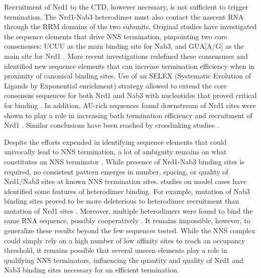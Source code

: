 Recruitment of Nrd1 to the CTD, however necessary, is not sufficient to trigger termination. 
The Nrd1-Nab3 heterodimer must also contact the nascent RNA through the RRM domains of the two subunits.
Original studies have investigated the sequence elements that drive NNS termination, pinpointing two core consensuses: UCUU as the main binding site for Nab3, and GUA[A/G] as the main site for Nrd1 \cite{carroll:2004:identification}. 
More recent investigations redefined these consensuses and identified new sequence elements that can increase termination efficiency when in proximity of canonical binding sites. 
Use of an \invivo{} SELEX (Systematic Evolution of Ligands by Exponential enrichment) strategy allowed to extend the core consensus sequences for both Nrd1 and Nab3 with nucleotides that proved critical for binding \cite{porrua:2012:in}. 
In addition, AU-rich sequences found downstream of Nrd1 sites were shown to play a role in increasing both termination efficiency and recruitment of Nrd1 \cite{porrua:2012:in}. Similar conclusions have been reached by \invivo{} crosslinking studies \cite{wlotzka:2011:nuclear}.

Despite the efforts expended in identifying sequence elements that could univocally lead to NNS termination, a lot of ambiguity remains on what constitutes an NNS terminator \invivo{}. 
While presence of Nrd1-Nab3 binding sites is required, no consistent pattern emerges in number, spacing, or quality of Nrd1/Nab3 sites at known NNS termination sites. 
\Invitro{} studies on model cases have identified some features of heterodimer binding. 
For example, mutation of Nab3 binding sites proved to be more deleterious to heterodimer recruitment than mutation of Nrd1 sites \cite{carroll:2007:interaction}. 
Moreover, multiple heterodimers were found to bind the same RNA sequence, possibly cooperatively  \cite{carroll:2007:interaction}. 
It remains impossible, however, to generalize these results beyond the few sequences tested. 
While the NNS complex could simply rely on a high number of low affinity sites to reach an occupancy threshold, it remains possible that several unseen elements play a role in qualifying NNS terminators, influencing the quantity and quality of Nrd1 and Nab3 binding sites necessary for an efficient termination.

